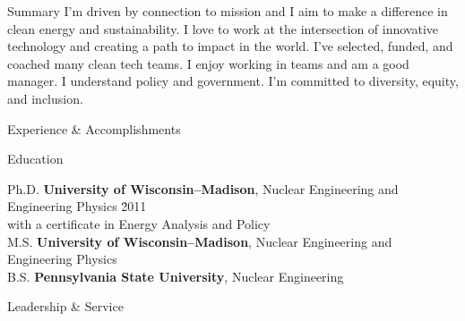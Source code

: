 \documentclass{resume3} %
\begin{document}
\begin{rSection}{Summary}
I'm driven by connection to mission and I aim to make a difference in clean energy and sustainability. I love to work at the intersection of innovative technology and creating a path to impact in the world. I've selected, funded, and coached many clean tech teams. I enjoy working in teams and am a good manager. I understand policy and government. I'm committed to diversity, equity, and inclusion. 
\end{rSection}

\begin{rSection}{Experience \& Accomplishments}

\end{rSection}

%


\begin{rSection}{Education}

\begin{tabbing}
Ph.D. \hspace*{1 em}\= \textbf{University of Wisconsin--Madison}, Nuclear Engineering and Engineering Physics \hspace*{1em} \= 2011 \\
      \> with a certificate in Energy Analysis and Policy \\
%
M.S. \hspace*{1 em}\> \textbf{University of Wisconsin--Madison}, Nuclear Engineering and Engineering Physics   \\
%
B.S. \hspace*{1 em}\> \textbf{Pennsylvania State University}, Nuclear Engineering  
\end{tabbing}
\end{rSection}
\vspace*{0.5em}
\begin{rSection}{Leadership \& Service}

\end{rSection}
\end{document}
